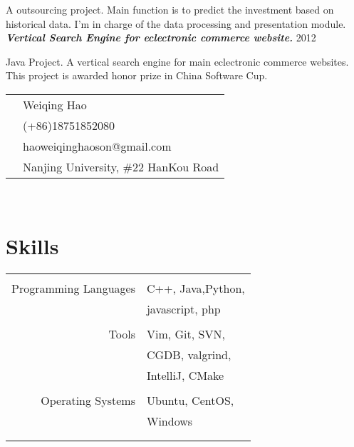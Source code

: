 \documentclass[10pt]{article} %
\begin{document}
\begin{minipage}[t]{0.6\textwidth}
\normalsize{A outsourcing project. Main function is to predict the investment based on historical data. I'm in charge of the data processing and presentation module.}\\

{\bf \large \textit{Vertical Search Engine for eclectronic commerce website.}} \hfill  \hfill {2012\\}

\normalsize{Java Project. A vertical search engine for main eclectronic commerce websites. This project is awarded honor prize in China Software Cup.}\\



\end{minipage} %
\hfill
\begin{minipage}[t]{0.32\textwidth} %
\vspace{0pt} %

\colorbox{shade}{\textcolor{text1}{
\begin{tabular}{c|p{6cm}}
\raisebox{0pt} & Weiqing Hao \\ %
\raisebox{-3pt}{\Mobilefone} &  (+86)18751852080 \\ %
\raisebox{-1pt}{\Letter} & haoweiqinghaoson@gmail.com \\ %
\raisebox{-4pt}{\textifsymbol{18}} & Nanjing University, \#22 HanKou Road \\ %
\end{tabular}
}
}\\[10pt]



\section{Skills} 

\begin{tabular}{rl}
& \\
Programming Languages
& C++, Java,Python, \\
& javascript, php\\
& \\
Tools
& Vim, Git, SVN,\\
& CGDB, valgrind, \\
& IntelliJ, CMake\\
& \\
Operating Systems
& Ubuntu, CentOS,\\
& Windows\\
& \\ \\
\end{tabular}


\end{minipage}
\end{document}
